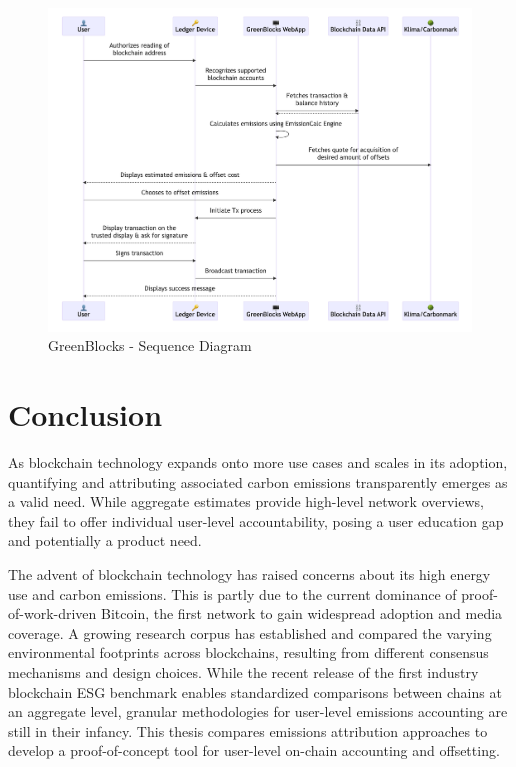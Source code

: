 \documentclass[11pt]{report}
\begin{document}
\begin{figure}[hbt!]
    \centering
    \centerline{\includegraphics[scale=.26]{figures/sequence.png}}
    \caption{GreenBlocks - Sequence Diagram}
    \label{fig:sequence}
\end{figure}


\chapter{Conclusion}

As blockchain technology expands onto more use cases and scales in its adoption, quantifying and attributing associated carbon emissions transparently emerges as a valid need. While aggregate estimates provide high-level network overviews, they fail to offer individual user-level accountability, posing a user education gap and potentially a product need.

The advent of blockchain technology has raised concerns about its high energy use and carbon emissions. This is partly due to the current dominance of proof-of-work-driven Bitcoin, the first network to gain widespread adoption and media coverage. A growing research corpus has established and compared the varying environmental footprints across blockchains, resulting from different consensus mechanisms and design choices. While the recent release of the first industry blockchain ESG benchmark enables standardized comparisons between chains at an aggregate level, granular methodologies for user-level emissions accounting are still in their infancy. This thesis compares emissions attribution approaches to develop a proof-of-concept tool for user-level on-chain accounting and offsetting.
\end{document}
